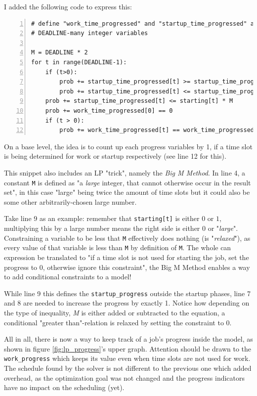 I added the following code to express this:

\begin{lstlisting}[frame=single, numbers=left, caption={Progress Variables in LP}, label={list:lp_progress}, basicstyle=\ttfamily, breaklines]
# define "work_time_progressed" and "startup_time_progressed" as 
# DEADLINE-many integer variables

M = DEADLINE * 2
for t in range(DEADLINE-1):
    if (t>0):
        prob += startup_time_progressed[t] >= startup_time_progressed[t-1] + 1 - (1 - starting[t]) * M 
        prob += startup_time_progressed[t] <= startup_time_progressed[t-1] + 1 + (1 - starting[t]) * M
    prob += startup_time_progressed[t] <= starting[t] * M 
    prob += work_time_progressed[0] == 0
    if (t > 0):
        prob += work_time_progressed[t] == work_time_progressed[t-1] + work[t]
\end{lstlisting}

On a base level, the idea is to count up each progress variables by 1, if a time slot is being determined for work or startup respectively (see line 12 for this).

This snippet also includes an LP "trick", namely the \emph{Big M Method}. 
In line 4, a constant \verb|M| is defined as "a \emph{large} integer, that cannot otherwise occur in the result set", in this case "large" being twice the amount of time slots but it could also be some other arbitrarily-chosen large number.

Take line 9 as an example: 
remember that \verb|starting[t]| is either $0$ or $1$, multiplying this by a large number means the right side is either $0$ or "\emph{large}". 
Constraining a variable to be less that \verb|M| effectively does nothing (is "\emph{relaxed}"), as every value of that variable is less than \verb|M| by definition of \verb|M|. 
The whole can expression be translated to "if a time slot is not used for starting the job, set the progress to 0, otherwise ignore this constraint", the Big M Method enables a way to add conditional constraints to a model!

While line 9 this defines the \verb|startup_progress| outside the startup phases, line 7 and 8 are needed to increase the progress by exactly 1. 
Notice how depending on the type of inequality, \emph{M} is either added or subtracted to the equation, a conditional "greater than"-relation is relaxed by setting the constraint to 0.

All in all, there is now a way to keep track of a job's progress inside the model, as shown in figure \ref{fig:lp_progress}'s upper graph. Attention should be drawn to the \verb|work_progress| which keeps its value even when time slots are not used for work. 
The schedule found by the solver is not different to the previous one which added overhead, as the optimization goal was not changed and the progress indicators have no impact on the scheduling (yet).

